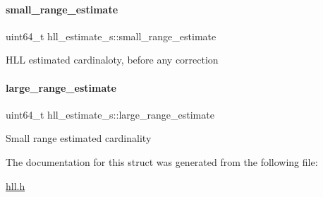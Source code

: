 \paragraph{\texorpdfstring{small\+\_\+range\+\_\+estimate}{small\_range\_estimate}}
{\footnotesize\ttfamily uint64\+\_\+t hll\+\_\+estimate\+\_\+s\+::small\+\_\+range\+\_\+estimate}

H\+LL estimated cardinaloty, before any correction \mbox{\label{structhll__estimate__s_ae6e8601592aec248a11f378e1b946f60}} 
\paragraph{\texorpdfstring{large\+\_\+range\+\_\+estimate}{large\_range\_estimate}}
{\footnotesize\ttfamily uint64\+\_\+t hll\+\_\+estimate\+\_\+s\+::large\+\_\+range\+\_\+estimate}

Small range estimated cardinality 

The documentation for this struct was generated from the following file\+:\begin{DoxyCompactItemize}
\item 
\hyperlink{hll_8h}{hll.\+h}\end{DoxyCompactItemize}
